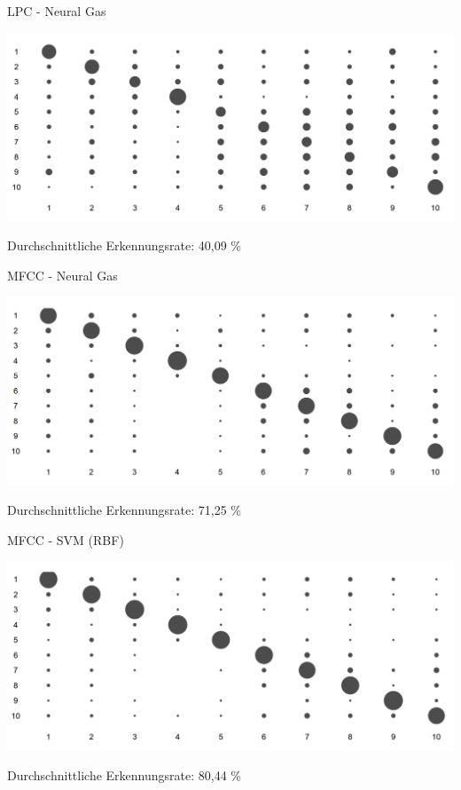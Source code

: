 \begin{frame}{LPC - Neural Gas}
	\begin{center}
		\includegraphics[width=1.0\textwidth]{img/lpcNgMatrix}
	\end{center}
	\begin{center}
		Durchschnittliche Erkennungsrate: 40,09 \%
	\end{center}
\end{frame}

\begin{frame}{MFCC - Neural Gas}
	\begin{center}
		\includegraphics[width=1.0\textwidth]{img/mfccNgMatrix}
	\end{center}
	\begin{center}
		Durchschnittliche Erkennungsrate: 71,25 \%
	\end{center}
\end{frame}

\begin{frame}{MFCC - SVM (RBF)}
	\begin{center}
		\includegraphics[width=1.0\textwidth]{img/mfccSvmRbfMatrix}
	\end{center}
	\begin{center}
		Durchschnittliche Erkennungsrate: 80,44 \%
	\end{center}
\end{frame}

